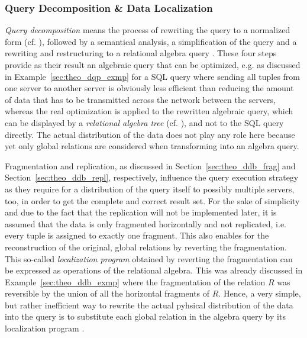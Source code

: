 \subsubsection{Query Decomposition \& Data Localization}
\label{sec:theo_dqp_decomp}

\emph{Query decomposition} means the process of rewriting the query to a normalized form (cf. \cite[p.~21,p.189f.]{Ozsu1991}), followed by a semantical
analysis, a simplification of the query and a rewriting and restructuring to a relational algebra query \cite[p.~183]{Ozsu1991}. These four steps provide
as their result an algebraic query that can be optimized, e.g. as discussed in Example~\ref{sec:theo_dqp_exmp} for a SQL query where sending all tuples
from one server to another server is obviously less efficient than reducing the amount of data that has to be transmitted across the network between the
servers, whereas the real optimization is applied to the rewritten algebraic query, which can be displayed by a \emph{relational algebra tree}
(cf. \cite[Figure~8.3, p.~195]{Ozsu1991}), and not to the SQL query directly. The actual distribution of the data does not play any role here because
yet only global relations are considered when transforming into an algebra query.

Fragmentation and replication, as discussed in Section~\ref{sec:theo_ddb_frag} and Section~\ref{sec:theo_ddb_repl}, respectively, influence the query
execution strategy as they require for a distribution of the query itself to possibly multiple servers, too, in order to get the complete and correct 
result set. For the sake of simplicity and due to the fact that the replication will not be implemented later, it is assumed that the data is only 
fragmented horizontally and not replicated, i.e. every tuple is assigned to exactly one fragment. This also enables for the reconstruction of the original,
global relations by reverting the fragmentation. This so-called \emph{localization program} \cite[p.~199]{Ozsu1991} obtained by reverting the 
fragmentation can be expressed as operations of the relational algebra. This was already discussed in Example~\ref{sec:theo_ddb_exmp} where the
fragmentation of the relation $R$ was reversible by the union of all the horizontal fragments of $R$. Hence, a very simple, but rather inefficient way to
rewrite the actual pyhsical distribution of the data into the query is to substitute each global relation in the algebra query by its localization program 
\cite[p.~199]{Ozsu1991}.

